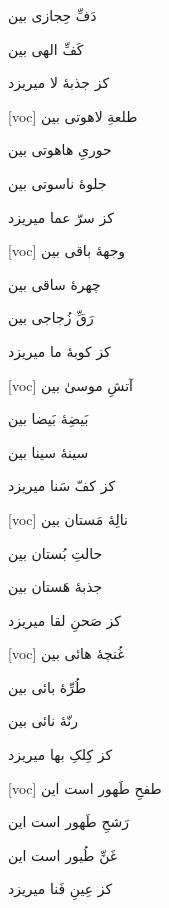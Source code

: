 \documentclass[11pt]{article}
\newenvironment{orig}
  {\begin{farsi}[voc]}
  {\end{farsi}}
\newenvironment{word}{}{}
\newcommand{\ayat}[1]{\vspace{4ex}\begin{orig}#1\end{orig}}
\begin{document}
\begin{word}
{دَفِّ حِجازی بین

کَفِّ الهی بین

کز جذبۀ لا میریزد
}

\ayat{
طلعةِ لاهوتی بین

حوریِ هاهوتی بین

جلوۀ ناسوتی بین

کز سرّ عما میریزد
}

\ayat{
وجهۀ باقی بین

چهرۀ ساقی بین

رَقِّ زُجاجی بین

کز کوبۀ ما میریزد
}

\ayat{
آتشِ موسیٰ بین

بَیضِۀ بَیضا بین

سینۀ سینا بین

کز کفّ سَنا میریزد
}

\ayat{
نالِۀ مَستان بین

حالتِ بُستان بین

جذبۀ هَستان بین

کز صَحنِ لقا میریزد
}

\ayat{
غُنچۀ هائی بین

طُرِّۀ بائی بین

رنّۀ نائی بین

کز کِلکِ بها میریزد
}

\ayat{
طفحِ طَهور است این

رَشحِ طَهور است این

غَنِّ طُیور است این

کز عِینِ فَنا میریزد
}
\end{word}
\end{document}
